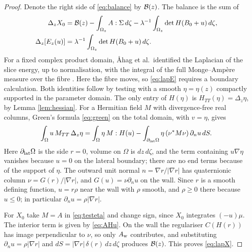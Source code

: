 \begin{proof}
Denote the right side of \eqref{eq:balance} by $\mathcal B(z)$. The balance is the sum of
\begin{align}
\Delta_zX_0&=\mathcal B(z)-\int_{\Omega_z}A:\Sigma\,d\zeta-\lambda^{-1}\int_{\Omega_z}\det H(B_0+u)\,d\zeta,
\label{eq:lapX}\\
\Delta_z[E_z(u)]&=\lambda^{-1}\int_{\Omega_z}\det H(B_0+u)\,d\zeta .\label{eq:lapE}
\end{align}
For a fixed complex product domain, \AA hag et al.\ identified the Laplacian of the slice energy,
up to normalisation, with the integral of the full Monge--Amp\`ere measure over the fibre
\cite[Theorem 3.1]{ACKPZ09}. Here the fibre moves, so \eqref{eq:lapE} requires a boundary
calculation. Both identities follow by testing with a smooth $\eta=\eta(z)$ compactly supported
in the parameter domain. The only entry of $H(\eta)$ is $H_{TT}(\eta)=\Delta_z\eta$, by Lemma
\ref{lem:hessian}. For a Hermitian field $M$ with divergence-free real columns, Green's formula
\eqref{eq:green} on the total domain, with $v=\eta$, gives
\begin{equation}\label{eq:testeta}
\int_\Omega u\,M_{TT}\,\Delta_z\eta=\int_\Omega\eta\,M:H(u)-\int_{\partial_{\rm lat}\Omega}\eta\,(\nu^*M\nu)\,\partial_nu\,dS .
\end{equation}
Here $\partial_{\rm lat}\Omega$ is the side $r=0$, volume on $\Omega$ is $dz\,d\zeta$, and the term
containing $u\nabla\eta$ vanishes because $u=0$ on the lateral boundary; there are no end terms
because of the support of $\eta$. The outward unit normal $n=\nabla r/|\nabla r|$ has quaternionic
column $\nu=G(r)/|\nabla r|$, and $G(u)=\nu\partial_nu$ on the wall. Since $r$ is a smooth defining
function, $u=r\rho$ near the wall with $\rho$ smooth, and $\rho\ge0$ there because $u\le0$; in
particular $\partial_nu=\rho|\nabla r|$.

For $X_0$ take $M=A$ in \eqref{eq:testeta} and change sign, since $X_0$ integrates $(-u)\mu$. The
interior term is given by \eqref{eq:AHu}. On the wall the regulariser $C(H(r))$ has image
perpendicular to $\nu$, so only $A_{\rm w}$ contributes, and substituting $\partial_nu=\rho|\nabla r|$
and $dS=|\nabla r|\,\delta(r)\,dz\,d\zeta$ produces $\mathcal B(z)$. This proves \eqref{eq:lapX}.


\end{proof}

